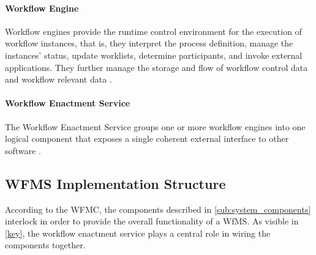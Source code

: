     \paragraph{Workflow Engine} %
    \label{par:workflow_engine}
      Workflow engines provide the runtime control environment for the execution of workflow instances, that is, they interpret the process definition, manage the instances' status, update worklists, determine participants, and invoke external applications. They further manage the storage and flow of workflow control data and workflow relevant data \cite{Hollingsworth1995Wfmc}.

    \paragraph{Workflow Enactment Service} %
    \label{par:workflow_enactment_service}
      The Workflow Enactment Service groups one or more workflow engines into one logical component that exposes a single coherent external interface to other software \cite{Hollingsworth1995Wfmc}.

  \subsection{WFMS Implementation Structure} %
  \label{sub:wfms_implementation_structure}
    According to the \ac{WFMC}, the components described in \ref{sub:system_components} interlock in order to provide the overall functionality of a \ac{WfMS}. As visible in \ref{key}, the workflow enactment service plays a central role in wiring the components together.

